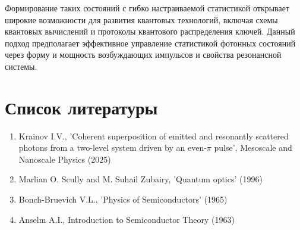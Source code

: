 \documentclass[11pt]{article}    %
\begin{document}
Формирование таких состояний с гибко настраиваемой статистикой открывает широкие возможности для развития квантовых технологий,
включая схемы квантовых вычислений и протоколы квантового распределения ключей.
Данный подход предполагает эффективное управление статистикой фотонных состояний через форму и мощность возбуждающих импульсов и свойства резонансной системы.

\section{Список литературы}

   \begin{enumerate}
       \item Krainov I.V., 'Coherent superposition of emitted and resonantly scattered photons from a two-level system driven by an even-$\pi$ pulse', Mesoscale and Nanoscale Physics (2025)
       \item Marlian O. Scully and M. Suhail Zubairy, 'Quantum optics' (1996)
       \item Bonch-Bruevich V.L., 'Physics of Semiconductors' (1965)
       \item Anselm A.I., Introduction to Semiconductor Theory (1963)
   \end{enumerate}
\end{document}
